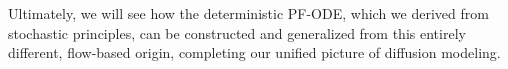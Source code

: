 Ultimately, we will see how the deterministic PF-ODE, which we derived from stochastic principles, can be constructed and generalized from this entirely different, flow-based origin, completing our unified picture of diffusion modeling.













